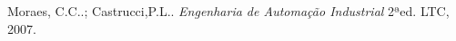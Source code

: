 \begin{thebibliography}{1}
  		Moraes, C.C..; Castrucci,P.L..
  		\emph{Engenharia de Automação Industrial}
 		 2ªed.
		LTC, 2007.



\end{thebibliography}

